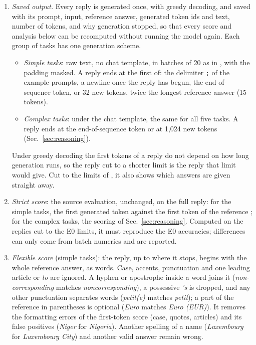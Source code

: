 \documentclass[11pt,a4paper]{article}
\begin{document}
\begin{enumerate}
\item \emph{Saved output.} Every reply is generated once, with greedy decoding, and saved with its prompt, input, reference answer, generated token ids and text, number of tokens, and why generation stopped, so that every score and analysis below can be recomputed without running the model again. Each group of tasks has one generation scheme.
\begin{itemize}
\item \emph{Simple tasks}: raw text, no chat template, in batches of 20 as in \citet{yang2026shared}, with the padding masked. A reply ends at the first of: the delimiter \texttt{;} of the example prompts, a newline once the reply has begun, the end-of-sequence token, or 32 new tokens, twice the longest reference answer (15 tokens).
\item \emph{Complex tasks}: under the chat template, the same for all five tasks. A reply ends at the end-of-sequence token or at 1,024 new tokens (Sec.~\ref{sec:reasoning}).
\end{itemize}
Under greedy decoding the first tokens of a reply do not depend on how long generation runs, so the reply cut to a shorter limit is the reply that limit would give. Cut to the limits of \citet[App.~A]{fu2026rules}, it also shows which answers are given straight away.
\item \emph{Strict score}: the source evaluation, unchanged, on the full reply: for the simple tasks, the first generated token against the first token of the reference \citep{yang2026shared}; for the complex tasks, the scoring of Sec.~\ref{sec:reasoning}. Computed on the replies cut to the E0 limits, it must reproduce the E0 accuracies; differences can only come from batch numerics and are reported.
\item \emph{Flexible score} (simple tasks): the reply, up to where it stops, begins with the whole reference answer, as words. Case, accents, punctuation and one leading article or \emph{to} are ignored. A hyphen or apostrophe inside a word joins it (\emph{non-corresponding} matches \emph{noncorresponding}), a possessive \emph{'s} is dropped, and any other punctuation separates words (\emph{petit(e)} matches \emph{petit}); a part of the reference in parentheses is optional (\emph{Euro} matches \emph{Euro (EUR)}). It removes the formatting errors of the first-token score (case, quotes, articles) and its false positives (\emph{Niger} for \emph{Nigeria}). Another spelling of a name (\emph{Luxembourg} for \emph{Luxembourg City}) and another valid answer remain wrong.

\end{enumerate}
\end{document}
